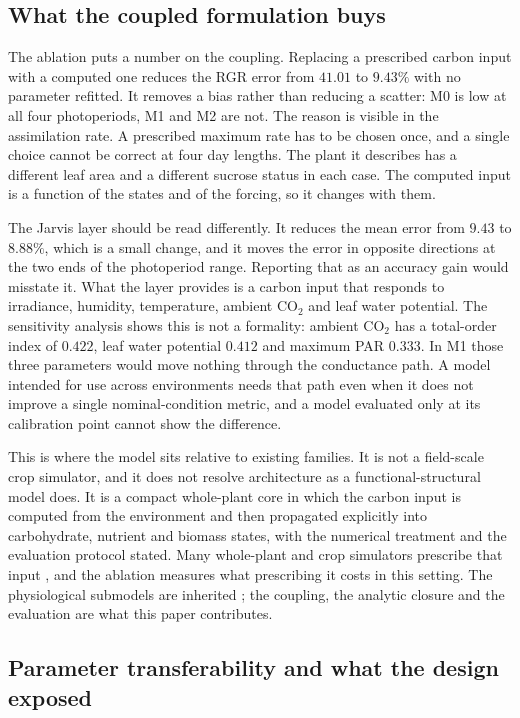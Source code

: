 \subsection{What the coupled formulation buys}

The ablation puts a number on the coupling. Replacing a prescribed carbon input
with a computed one reduces the RGR error from $41.01$ to $9.43\%$ with no
parameter refitted. It removes a bias rather than reducing a scatter: M0 is low
at all four photoperiods, M1 and M2 are not. The reason is visible in the
assimilation rate. A prescribed maximum rate has to be chosen once, and a single
choice cannot be correct at four day lengths. The plant it describes has a
different leaf area and a different sucrose status in each case. The
computed input is a function of the states and of the forcing, so it changes
with them.

The Jarvis layer should be read differently. It reduces the mean error from
$9.43$ to $8.88\%$, which is a small change, and it moves the error in opposite
directions at the two ends of the photoperiod range. Reporting that as an
accuracy gain would misstate it. What the layer provides is a carbon input that
responds to irradiance, humidity, temperature, ambient CO$_2$ and leaf water
potential. The sensitivity analysis shows this is not a formality: ambient
CO$_2$ has a total-order index of $0.422$, leaf water potential $0.412$ and
maximum PAR $0.333$. In M1 those three parameters would move nothing through
the conductance path. A model intended for use across environments needs that
path even when it does not improve a single nominal-condition metric, and a
model evaluated only at its calibration point cannot show the difference.

This is where the model sits relative to existing families. It is not a
field-scale crop simulator, and it does not resolve architecture as a
functional-structural model does. It is a compact whole-plant core in which the
carbon input is computed from the environment and then propagated explicitly
into carbohydrate, nutrient and biomass states, with the numerical treatment and
the evaluation protocol stated. Many whole-plant and crop simulators prescribe
that input \citep{Holzworth2014,Jones2003,deWit2019}, and the ablation measures
what prescribing it costs in this setting. The physiological submodels are
inherited \citep{Farquhar1980,Jarvis1976,vonCaemmerer2000}; the coupling, the
analytic closure and the evaluation are what this paper contributes.

\subsection{Parameter transferability and what the design exposed}

